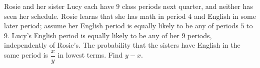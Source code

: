 Rosie and her sister Lucy each have $9$ class periods next quarter, and neither has seen her schedule. Rosie learns that she has math in period $4$ and English in some later period; assume her English period is equally likely to be any of periods $5$ to $9$. Lucy's English period is equally likely to be any of her $9$ periods, independently of Rosie's. The probability that the sisters have English in the same period is $\dfrac xy$ in lowest terms. Find $y-x$.
